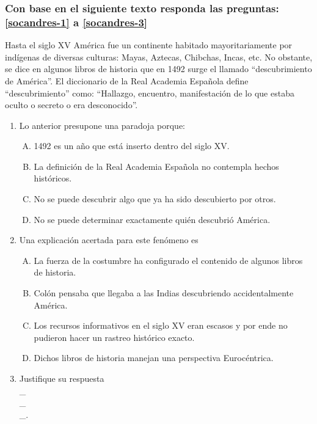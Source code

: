

\subsubsection*{Con base en el siguiente texto responda las preguntas: \ref{socandres-1} a \ref{socandres-3}}
Hasta el siglo XV América fue un continente habitado mayoritariamente por indígenas de diversas culturas: Mayas, Aztecas, Chibchas, Incas, etc. No obstante, se dice en algunos libros de historia que en 1492 surge el llamado ``descubrimiento de América''. El diccionario de la Real Academia Española define ``descubrimiento'' como: ``Hallazgo, encuentro, manifestación de lo que estaba oculto o secreto o era desconocido''.

\begin{enumerate}
\item Lo anterior presupone una paradoja porque: \label{socandres-1}

\begin{enumerate}[(A)]
\item 1492 es un año que está inserto dentro del siglo XV.
\item La definición de la Real Academia Española no contempla hechos históricos.
\item No se puede descubrir algo que ya ha sido descubierto por otros.
\item No se puede determinar exactamente quién descubrió América.
\end{enumerate}


\newpage
\item Una explicación acertada para este fenómeno es\label{socandres-2}
\begin{enumerate}[(A)]
\item La fuerza de la costumbre ha configurado el contenido de algunos libros de historia.
\item Colón pensaba que llegaba a las Indias descubriendo accidentalmente América.
\item Los recursos informativos en el siglo XV eran escasos y por ende no pudieron hacer un rastreo histórico exacto.
\item Dichos libros de historia manejan una perspectiva Eurocéntrica.
\end{enumerate}

\item Justifique su respuesta \label{socandres-3} \hrulefill\\
\_\hrulefill\\
\_\hrulefill\\
\_\hrulefill.


\end{enumerate}
